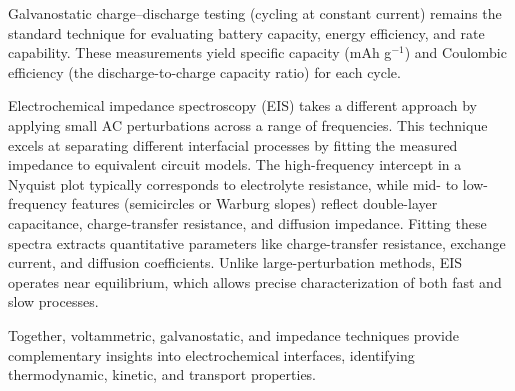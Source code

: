 Galvanostatic charge--discharge testing (cycling at constant current) remains the standard technique for evaluating battery capacity, energy efficiency, and rate capability. These measurements yield specific capacity (mAh g$^{-1}$) and Coulombic efficiency (the discharge-to-charge capacity ratio) for each cycle.

Electrochemical impedance spectroscopy (EIS) takes a different approach by applying small AC perturbations across a range of frequencies. This technique excels at separating different interfacial processes by fitting the measured impedance to equivalent circuit models. The high-frequency intercept in a Nyquist plot typically corresponds to electrolyte resistance, while mid- to low-frequency features (semicircles or Warburg slopes) reflect double-layer capacitance, charge-transfer resistance, and diffusion impedance. Fitting these spectra extracts quantitative parameters like charge-transfer resistance, exchange current, and diffusion coefficients. Unlike large-perturbation methods, EIS operates near equilibrium, which allows precise characterization of both fast and slow processes.\supercite{Lazanas2023}

Together, voltammetric, galvanostatic, and impedance techniques provide complementary insights into electrochemical interfaces, identifying thermodynamic, kinetic, and transport properties.


 

